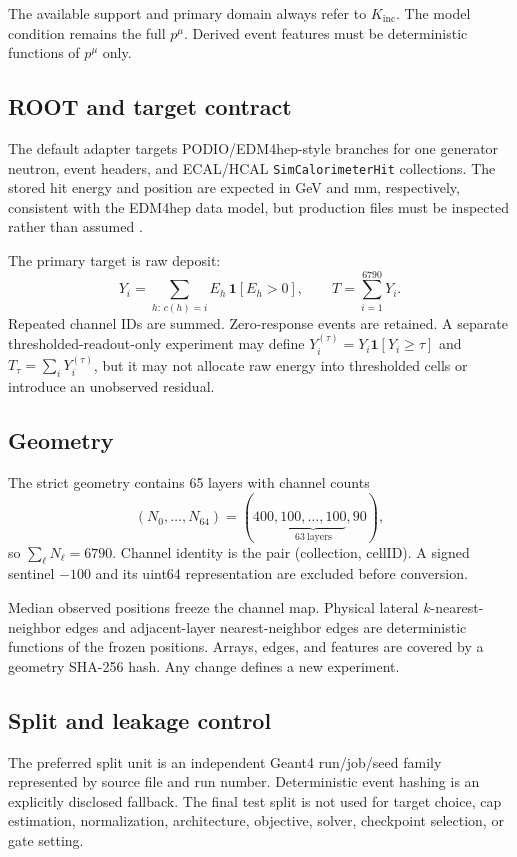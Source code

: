 \documentclass[10pt,a4paper]{article}
\newcommand{\pFour}{p^{\mu}}
\newcommand{\Kinc}{K_{\mathrm{inc}}}
\begin{document}
The available support and primary domain always refer to $\Kinc$. The model condition remains the full $\pFour$. Derived event features must be deterministic functions of $\pFour$ only.

\subsection{ROOT and target contract}
The default adapter targets PODIO/EDM4hep-style branches for one generator neutron, event headers, and ECAL/HCAL \texttt{SimCalorimeterHit} collections. The stored hit energy and position are expected in GeV and mm, respectively, consistent with the EDM4hep data model, but production files must be inspected rather than assumed \cite{edm4hep}.

The primary target is raw deposit:
\begin{equation}
 Y_i=\sum_{h:\,c(h)=i} E_h\,\mathbf 1[E_h>0],\qquad
 T=\sum_{i=1}^{6790}Y_i.
 \label{eq:rawtarget}
\end{equation}
Repeated channel IDs are summed. Zero-response events are retained. A separate thresholded-readout-only experiment may define $Y_i^{(\tau)}=Y_i\mathbf 1[Y_i\ge\tau]$ and $T_\tau=\sum_iY_i^{(\tau)}$, but it may not allocate raw energy into thresholded cells or introduce an unobserved residual.

\subsection{Geometry}
The strict geometry contains 65 layers with channel counts
\begin{equation}
 (N_0,\ldots,N_{64})=(400,\underbrace{100,\ldots,100}_{63\ \mathrm{layers}},90),
\end{equation}
so $\sum_\ell N_\ell=6790$. Channel identity is the pair (collection, cellID). A signed sentinel $-100$ and its uint64 representation are excluded before conversion.

Median observed positions freeze the channel map. Physical lateral $k$-nearest-neighbor edges and adjacent-layer nearest-neighbor edges are deterministic functions of the frozen positions. Arrays, edges, and features are covered by a geometry SHA-256 hash. Any change defines a new experiment.

\subsection{Split and leakage control}
The preferred split unit is an independent Geant4 run/job/seed family represented by source file and run number. Deterministic event hashing is an explicitly disclosed fallback. The final test split is not used for target choice, cap estimation, normalization, architecture, objective, solver, checkpoint selection, or gate setting.
\end{document}
